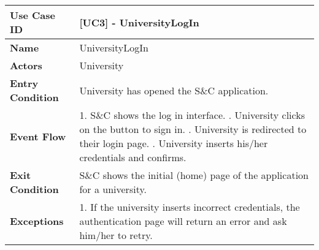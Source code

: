 \newpage

\begin{table}[H]
    \centering
    \renewcommand{\arraystretch}{2}
    \begin{tabular}{|l|p{10cm}|}
    \hline
    \textbf{Use Case ID} & [UC3] - UniversityLogIn \\ \hline
    \textbf{Name} & UniversityLogIn \\ \hline
    \textbf{Actors} & University \\ \hline
    \textbf{Entry Condition} & University has opened the S\&C application. \\ \hline
    \textbf{Event Flow} & 
    1. S\&C shows the log in interface. \newline
    2. University clicks on the button to sign in. \newline
    3. University is redirected to their login page. \newline
    4. University inserts his/her credentials and confirms. \\ \hline
    \textbf{Exit Condition} & S\&C shows the initial (home) page of the application for a university. \\ \hline
    \textbf{Exceptions} & 
    1. If the university inserts incorrect credentials, the authentication page will return an error and ask him/her to retry. \\ \hline
    \end{tabular}
\end{table}

\newpage
    
